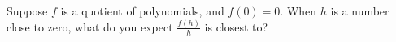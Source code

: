 \documentclass{ximera}
\begin{document}
\begin{problem}

  Suppose $f$ is a quotient of polynomials, and $f(0) = 0$.  When $h$
  is a number close to zero, what do you expect $\frac{f(h)}{h}$ is
  closest to?
  \begin{multipleChoice}
  \end{multipleChoice}
\end{problem}
\end{document}
